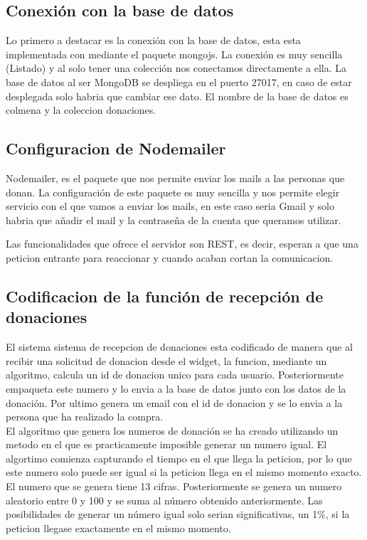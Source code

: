 
\subsection{Conexión con la base de datos}

Lo primero a destacar es la conexión con la base de datos, esta esta implementada con mediante el paquete mongojs. La conexión es muy sencilla (Listado) y al solo tener una colección nos conectamos directamente a ella. La  base de datos al ser MongoDB se despliega en el puerto 27017, en caso de estar desplegada solo habria que cambiar ese dato. El nombre de la base de datos es colmena y la coleccion donaciones.\\


\subsection{Configuracion de Nodemailer}
Nodemailer\cite{keylist}, es el paquete que nos permite enviar los mails a las personas que donan. La configuración de este paquete es muy sencilla y nos permite elegir servicio con el que vamos a enviar los mails, en este caso seria Gmail y solo habria que añadir el mail y la contraseña de la cuenta que queramos utilizar.


Las funcionalidades que ofrece el servidor son REST, es decir, esperan a que una peticion entrante para reaccionar y cuando acaban cortan la comunicacion. 

\subsection{Codificacion de la función de recepción de donaciones}
El sistema sistema de recepcion de donaciones esta codificado de manera que al recibir una solicitud de donacion desde el widget, la funcion, mediante un algoritmo, calcula un id de donacion unico para cada usuario. Posteriormente empaqueta este numero y lo envia a la base de datos junto con los datos de la donación. Por ultimo genera un email con el id de donacion y se lo envia a la persona que ha realizado la compra.\\

El algoritmo que genera los numeros de donación se ha creado utilizando un metodo en el que es practicamente imposible generar un numero igual. El algortimo comienza capturando el tiempo en el que llega la peticion, por lo que este numero solo puede ser igual si la peticion llega en el mismo momento exacto. El numero que se genera tiene 13 cifras. Posteriormente se genera un numero aleatorio entre 0 y 100 y se suma al número obtenido anteriormente. Las posibilidades de generar un número igual solo serian significativas, un 1\%, si la peticion llegase exactamente en el mismo momento.

